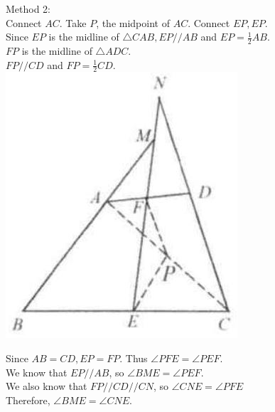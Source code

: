 \documentclass{article}
\begin{document}
Method 2:\\
Connect \(A C\). Take \(P\), the midpoint of \(A C\). Connect \(E P, E P\).\\
Since \(E P\) is the midline of \(\triangle C A B, E P / / A B\) and \(E P=\frac{1}{2} A B\).\\
\(F P\) is the midline of \(\triangle A D C\).\\
\(F P / / C D\) and \(F P=\frac{1}{2} C D\).\\
\centering
\includegraphics[width=\textwidth]{images/043.jpg}

Since \(A B=C D, E P=F P\). Thus \(\angle P F E=\angle P E F\).\\
We know that \(E P / / A B\), so \(\angle B M E=\angle P E F\).\\
We also know that \(F P / / C D / / C N\), so \(\angle C N E=\angle P F E\)\\
Therefore, \(\angle B M E=\angle C N E\).
\end{document}
